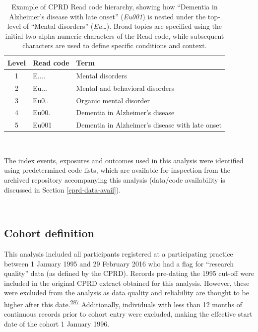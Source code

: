 \documentclass[a4paper, twoside]{templates/ociamthesis}
\begin{document}
\begin{table}[H]

\caption[Example of CPRD Read code hierarchy]{\label{tab:readExample-table}Example of CPRD Read code hierarchy, showing how ``Dementia in Alzheimer's disease with late onset'' (\emph{Eu001}) is nested under the top-level of ``Mental disorders'' (\emph{Eu\ldots{}}). Broad topics are specified using the initial two alpha-numeric characters of the Read code, while subsequent characters are used to define specific conditions and context.}
\centering
\begin{tabular}[t]{cll}
\toprule
\textbf{Level} & \textbf{Read code} & \textbf{Term}\\
\midrule
1 & E.... & Mental disorders\\
2 & Eu... & Mental and behavioral disorders\\
3 & Eu0.. & Organic mental disorder\\
4 & Eu00. & Dementia in Alzheimer's disease\\
5 & Eu001 & Dementia in Alzheimer's disease with late onset\\
\bottomrule
\end{tabular}
\end{table}

~

The index events, exposures and outcomes used in this analysis were identified using predetermined code lists, which are available for inspection from the archived repository accompanying this analysis (data/code availability is discussed in Section \ref{cprd-data-avail}).

~

\hypertarget{cohort-definition}{%
\subsection{Cohort definition}\label{cohort-definition}}

This analysis included all participants registered at a participating practice between 1 January 1995 and 29 February 2016 who had a flag for ``research quality'' data (as defined by the CPRD). Records pre-dating the 1995 cut-off were included in the original CPRD extract obtained for this analysis. However, these were excluded from the analysis as data quality and reliability are thought to be higher after this date.\textsuperscript{\protect\hyperlink{ref-wolf2019}{287}} Additionally, individuals with less than 12 months of continuous records prior to cohort entry were excluded, making the effective start date of the cohort 1 January 1996.
\end{document}

